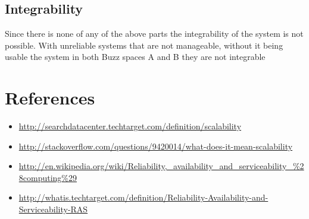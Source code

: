\documentclass[12pt]{article}
\begin{document}
\subsection{Integrability}
Since there is none of any of the above parts the integrability of the system is not possible. With unreliable systems that are not manageable, without it being usable the system in both Buzz spaces A and B they are not integrable

\section{References}
\begin{itemize}
\item \url{http://searchdatacenter.techtarget.com/definition/scalability }
\item \url{http://stackoverflow.com/questions/9420014/what-does-it-mean-scalability}
\item \url{http://en.wikipedia.org/wiki/Reliability,_availability_and_serviceability_%28computing%29}
\item \url{http://whatis.techtarget.com/definition/Reliability-Availability-and-Serviceability-RAS}
\end{itemize}
\end{document}
